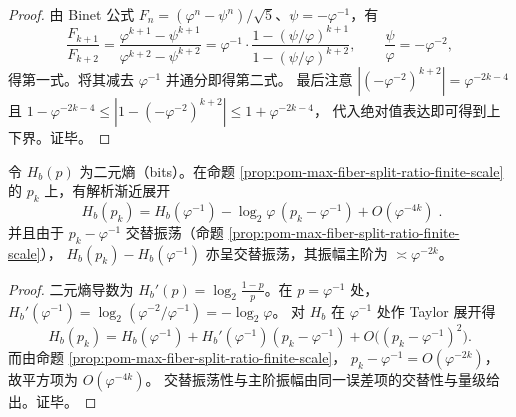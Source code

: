\begin{proof}
由 Binet 公式 \(F_n=(\varphi^n-\psi^n)/\sqrt5\)、\(\psi=-\varphi^{-1}\)，有
\[
\frac{F_{k+1}}{F_{k+2}}
=\frac{\varphi^{k+1}-\psi^{k+1}}{\varphi^{k+2}-\psi^{k+2}}
=\varphi^{-1}\cdot\frac{1-(\psi/\varphi)^{k+1}}{1-(\psi/\varphi)^{k+2}},
\qquad \frac{\psi}{\varphi}=-\varphi^{-2},
\]
得第一式。将其减去 \(\varphi^{-1}\) 并通分即得第二式。
最后注意 \(|(-\varphi^{-2})^{k+2}|=\varphi^{-2k-4}\) 且
\(
1-\varphi^{-2k-4}\le |1-(-\varphi^{-2})^{k+2}|\le 1+\varphi^{-2k-4}
\)，
代入绝对值表达即可得到上下界。证毕。
\end{proof}


\begin{proposition}\label{prop:pom-finite-scale-entropy-oscillation}
令 \(H_b(p)\) 为二元熵（bits）。在命题 \ref{prop:pom-max-fiber-split-ratio-finite-scale} 的 \(p_k\) 上，有解析渐近展开
\[
\boxed{\;
H_b(p_k)=H_b(\varphi^{-1})-\log_2\varphi\,(p_k-\varphi^{-1})+O(\varphi^{-4k})\; }.
\]
并且由于 \(p_k-\varphi^{-1}\) 交替振荡（命题 \ref{prop:pom-max-fiber-split-ratio-finite-scale}），
\(
H_b(p_k)-H_b(\varphi^{-1})
\)
亦呈交替振荡，其振幅主阶为 \(\asymp \varphi^{-2k}\)。
\end{proposition}

\begin{proof}
二元熵导数为 \(H_b'(p)=\log_2\frac{1-p}{p}\)。在 \(p=\varphi^{-1}\) 处，
\(
H_b'(\varphi^{-1})=\log_2(\varphi^{-2}/\varphi^{-1})=-\log_2\varphi
\)。
对 \(H_b\) 在 \(\varphi^{-1}\) 处作 Taylor 展开得
\[
H_b(p_k)=H_b(\varphi^{-1})+H_b'(\varphi^{-1})(p_k-\varphi^{-1})+O\bigl((p_k-\varphi^{-1})^2\bigr).
\]
而由命题 \ref{prop:pom-max-fiber-split-ratio-finite-scale}，
\(
p_k-\varphi^{-1}=O(\varphi^{-2k})
\)，故平方项为 \(O(\varphi^{-4k})\)。
交替振荡性与主阶振幅由同一误差项的交替性与量级给出。证毕。
\end{proof}


\endinput
